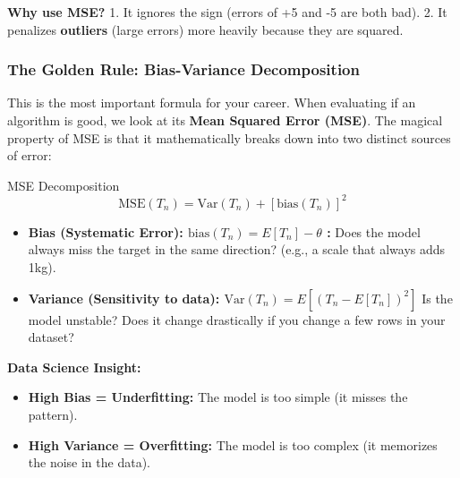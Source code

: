 \documentclass[11pt]{article}
\theoremstyle{smallexample}
\newcommand{\vs}{\vspace{0.2\baselineskip}}
\begin{document}
\textbf{Why use MSE?} 
1. It ignores the sign (errors of +5 and -5 are both bad).
2. It penalizes \textbf{outliers} (large errors) more heavily because they are squared.

\subsubsection{The Golden Rule: Bias-Variance Decomposition}
This is the most important formula for your career.  When evaluating if an algorithm is good, we look at its \textbf{Mean Squared Error (MSE)}. The magical property of MSE is that it mathematically breaks down into two distinct sources of error:


\begin{defbox}{MSE Decomposition}
\begin{equation}
\text{MSE}(T_n) = \text{Var}(T_n) + \left[\text{bias}(T_n)\right]^2
\end{equation}
\end{defbox}




\begin{itemize}
    \item \textbf{Bias (Systematic Error):  $\text{bias}(T_n) = E[T_n] - \theta$  :} Does the model always miss the target in the same direction? (e.g., a scale that always adds 1kg).
    \item \textbf{Variance (Sensitivity to data): $\text{Var}(T_n) = E\left[(T_n - E[T_n])^2\right]$} Is the model unstable? Does it change drastically if you change a few rows in your dataset?
\end{itemize}

\pagebreak
\textbf{Data Science Insight:} 
\begin{itemize}
    \item \textbf{High Bias = Underfitting:} The model is too simple (it misses the pattern).
    \item \textbf{High Variance = Overfitting:} The model is too complex (it memorizes the noise in the data).
\end{itemize}

\vs
\end{document}
